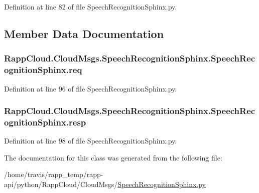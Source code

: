 Definition at line 82 of file Speech\-Recognition\-Sphinx.\-py.



\subsection{Member Data Documentation}
\hypertarget{classRappCloud_1_1CloudMsgs_1_1SpeechRecognitionSphinx_1_1SpeechRecognitionSphinx_aa5378aa2d3852fb0610c73b5a74a862b}{
\subsubsection[{req}]{\setlength{\rightskip}{0pt plus 5cm}Rapp\-Cloud.\-Cloud\-Msgs.\-Speech\-Recognition\-Sphinx.\-Speech\-Recognition\-Sphinx.\-req}}\label{classRappCloud_1_1CloudMsgs_1_1SpeechRecognitionSphinx_1_1SpeechRecognitionSphinx_aa5378aa2d3852fb0610c73b5a74a862b}


Definition at line 96 of file Speech\-Recognition\-Sphinx.\-py.

\hypertarget{classRappCloud_1_1CloudMsgs_1_1SpeechRecognitionSphinx_1_1SpeechRecognitionSphinx_ac5ba32178af1389bba6b75a6bf3982e7}{
\subsubsection[{resp}]{\setlength{\rightskip}{0pt plus 5cm}Rapp\-Cloud.\-Cloud\-Msgs.\-Speech\-Recognition\-Sphinx.\-Speech\-Recognition\-Sphinx.\-resp}}\label{classRappCloud_1_1CloudMsgs_1_1SpeechRecognitionSphinx_1_1SpeechRecognitionSphinx_ac5ba32178af1389bba6b75a6bf3982e7}


Definition at line 98 of file Speech\-Recognition\-Sphinx.\-py.



The documentation for this class was generated from the following file\-:\begin{DoxyCompactItemize}
\item 
/home/travis/rapp\-\_\-temp/rapp-\/api/python/\-Rapp\-Cloud/\-Cloud\-Msgs/\hyperlink{SpeechRecognitionSphinx_8py}{Speech\-Recognition\-Sphinx.\-py}\end{DoxyCompactItemize}
